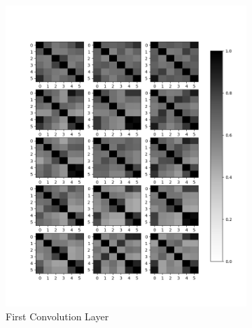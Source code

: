 \documentclass[11pt, twocolumn]{article}
\begin{document}
    \begin{figure}
	\centering
	\begin{subfigure}[b]{0.475\textwidth}
		\centering
		\includegraphics[width=\textwidth]{figs/c1.png}
		\caption[]%
		{{\small First Convolution Layer}}    
		\label{fig:c1}
	\end{subfigure}
	\hfill
	\begin{subfigure}[b]{0.475\textwidth}  
		\centering 

\end{subfigure}
\end{figure}
\end{document}
